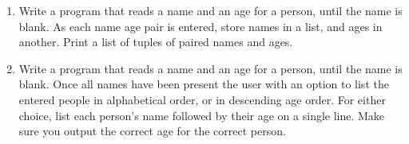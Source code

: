 \begin{enumerate}
	\item Write a program that reads a name and an age for a person, until    the name is blank. As each name age pair is entered, store names in    a list, and ages in another. Print a list of tuples of paired names    and ages.
	\item Write a program that reads a name and an age for a person, until    the name is blank. Once all names have been present the user with an    option to list the entered people in alphabetical order, or in    descending age order. For either choice, list each person's name    followed by their age on a single line. Make sure you output the    correct age for the correct person.
% 
% 
% 
% 			

\end{enumerate}

